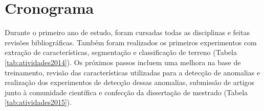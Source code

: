\chapter{Cronograma}

Durante o primeiro ano de estudo, foram cursadas todas as disciplinas e feitas revisões bibliográficas. Também foram realizados os primeiros experimentos com extração de características, segmentação e classificação de terreno (Tabela \ref{tab:atividades2014}). Os próximos passos incluem uma melhora na base de treinamento, revisão das características utilizadas para a detecção de anomalias e realização dos experimentos de detecção dessas anomalias, submissão de artigos junto à comunidade científica e confecção da dissertação de mestrado (Tabela \ref{tab:atividades2015}).

\begin{table}[h]
\caption{Atividades realizadas em 2014}
\label{tab:atividades2014}
\end{table}

\begin{table}[h]
\caption{Cronograma de atividades para 2015}
\label{tab:atividades2015}
\end{table}